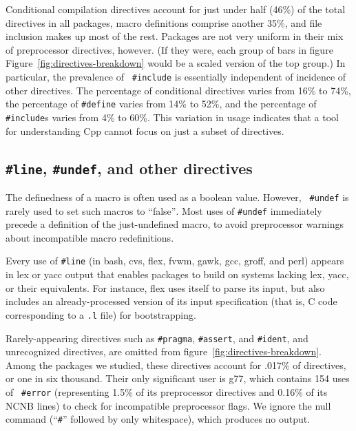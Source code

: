 \documentclass[10pt]{article}
\newcommand{\pkg}[1]{\textsf{#1}}
\begin{document}
Conditional compilation directives account for just under half (46\%) of
the total directives in all packages, macro definitions comprise another
35\%, and file inclusion makes up most of the rest.  Packages are not very
uniform in their mix of preprocessor directives, however.  (If they were,
each group of bars in figure Figure~\ref{fig:directives-breakdown} would be
a scaled version of the top group.)  In particular, the prevalence of {\tt
\#include} is essentially independent of incidence of other directives.
The percentage of conditional directives varies from 16\% to 74\%, the
percentage of {\tt \#define} varies from 14\% to 52\%, and the percentage
of {\tt \#include}s varies from 4\% to 60\%.  This variation in usage
indicates that a tool for understanding Cpp cannot focus on just a subset
of directives.  


\subsection{{\tt \#line}, {\tt \#undef}, and other directives}

The definedness of a macro is often used as a boolean value.  However, {\tt
\#undef} is rarely used to set such macros to ``false''$\!$.  Most uses of
{\tt \#undef} immediately precede a definition of the just-undefined macro,
to avoid preprocessor warnings about incompatible macro redefinitions.

Every use of {\tt \#line} (in \pkg{bash}, \pkg{cvs}, \pkg{flex}, \pkg{fvwm},
\pkg{gawk}, \pkg{gcc}, \pkg{groff}, and \pkg{perl}) appears in lex or yacc
output that enables packages to build on systems lacking lex, yacc, or
their equivalents.  For instance, \pkg{flex} uses itself to parse its
input, but also includes an already-processed version of its input
specification (that is, C code corresponding to a {\tt .l} file) for
bootstrapping.


Rarely-appearing directives such as {\tt \#pragma}, {\tt \#assert}, and
{\tt \#ident}, and unrecognized directives, are omitted from
figure~\ref{fig:directives-breakdown}.  Among the packages we studied,
these directives account for .017\% of directives, or one in six thousand.
Their only significant user is \pkg{g77}, which contains 154 uses of {\tt
\#error} (representing 1.5\% of its preprocessor directives and 0.16\% of
its NCNB lines) to check for incompatible preprocessor flags.  We ignore
the null command (``{\tt \#}'' followed by only whitespace), which produces
no output.
\end{document}
